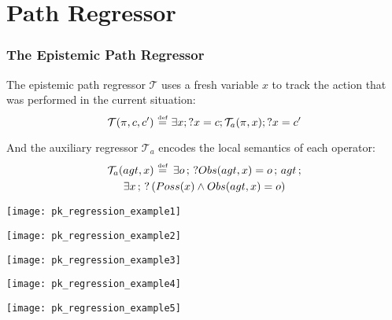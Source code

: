 \documentclass[compress]{beamer}
\newcommand{\isdef}{\hbox{$\stackrel{\mbox{\tiny def}}{=}$}}
\newcommand{\Trn}{\mathcal{T}}
\newcommand{\TrnA}{\Trn_{a}}
\begin{document}
\section{Path Regressor}

\begin{frame}
\frametitle{The Epistemic Path Regressor}
The epistemic path regressor $\Trn$ uses a fresh variable $x$ to track the action that was performed in the current situation:
\begin{equation*}
\Trn(\pi,c,c')\,\,\isdef\,\,\exists x ; ?x=c ; \TrnA(\pi,x) ; ?x=c'
\end{equation*}

\pause
And the auxiliary regressor $\TrnA$ encodes the local semantics of each operator:
\begin{multline*}
\TrnA(agt,x) \,\,\isdef \,\,\,\exists o\,;\,?Obs(agt,x)=o\,;\,agt\,;\\
   \exists x\,;\,?\left(Poss(x)\wedge Obs(agt,x)=o\right)
\end{multline*}
\end{frame}

\begin{frame}
\begin{center}
  \texttt{[image: pk\_regression\_example1]}
\end{center}
\end{frame}

\begin{frame}
\begin{center}
  \texttt{[image: pk\_regression\_example2]}
\end{center}
\end{frame}

\begin{frame}
\begin{center}
  \texttt{[image: pk\_regression\_example3]}
\end{center}
\end{frame}

\begin{frame}
\begin{center}
  \texttt{[image: pk\_regression\_example4]}
\end{center}
\end{frame}

\begin{frame}
\begin{center}
  \texttt{[image: pk\_regression\_example5]}
\end{center}
\end{frame}
\end{document}
